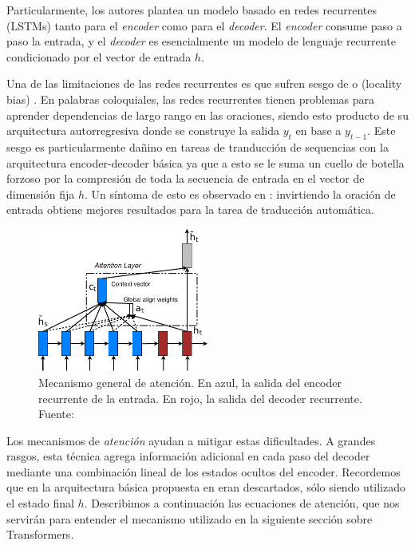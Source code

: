 Particularmente, los autores plantea un modelo basado en redes recurrentes (LSTMs) tanto para el \emph{encoder} como para el \emph{decoder}. El \emph{encoder} consume paso a paso la entrada, y el \emph{decoder} es esencialmente un modelo de lenguaje recurrente condicionado por el vector de entrada $h$.

Una de las limitaciones de las redes recurrentes es que sufren sesgo de  o  (locality bias) \cite{battaglia2018relational}. En palabras coloquiales, las redes recurrentes tienen problemas para aprender dependencias de largo rango en las oraciones, siendo esto producto de su arquitectura autorregresiva donde se construye la salida $y_t$ en base a $y_{t-1}$. Este sesgo es particularmente dañino en tareas de tranducción de sequencias con la arquitectura encoder-decoder básica ya que a esto se le suma un cuello de botella forzoso por la compresión de toda la secuencia de entrada en el vector de dimensión fija $h$. Un síntoma de esto es observado en \citet{sutskever2014sequence}: invirtiendo la oración de entrada obtiene mejores resultados para la tarea de traducción automática.


\begin{figure}[t]
    \centering
    \includegraphics[width=0.5\textwidth]{img/02/attention_model.pdf}
    \caption{Mecanismo general de atención. En azul, la salida del encoder recurrente de la entrada. En rojo, la salida del decoder recurrente. Fuente: \citet{luong2015effective}}
    \label{fig:attention_mechanism}
\end{figure}


Los mecanismos de \emph{atención} \cite{bahdanau2014neural} ayudan a mitigar estas dificultades. A grandes rasgos, esta técnica agrega información adicional en cada paso del decoder mediante una combinación lineal de los estados ocultos del encoder. Recordemos que en la arquitectura básica propuesta en \citet{sutskever2014sequence} eran descartados, sólo siendo utilizado el estado final $h$. Describimos a continuación las ecuaciones de atención, que nos servirán para entender el mecanismo utilizado en la siguiente sección sobre Transformers.

